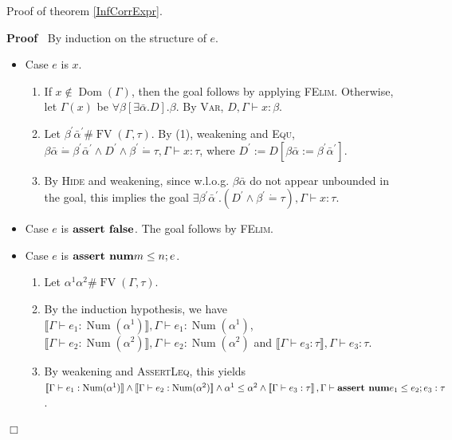 \documentclass{article}
\newcommand{\assign}{:=}
\newcommand{\nin}{\not\in}
\newcommand{\tmname}[1]{\textsc{#1}}
\newcommand{\tmop}[1]{\ensuremath{\operatorname{#1}}}
\newcommand{\tmstrong}[1]{\textbf{#1}}
\newenvironment{proof}{\noindent\textbf{Proof\ }}{\hspace*{\fill}$\Box$\medskip}
\begin{document}
Proof of theorem \ref{InfCorrExpr}.

\begin{proof}
  By induction on the structure of $e$.
  \begin{itemize}
    \item Case $e$ is $x$.
    \begin{enumerate}
      \item If $x \nin \tmop{Dom} (\Gamma)$, then the goal follows by applying
      {\tmname{FElim}}. Otherwise, let $\Gamma (x)$ be $\forall \beta [\exists
      \bar{\alpha} .D] . \beta$. By {\tmname{Var}}, $D, \Gamma \vdash x :
      \beta$.
      
      \item Let $\beta^{\prime} \bar{\alpha}^{\prime} \# \tmop{FV} (\Gamma,
      \tau)$. By (1), weakening and {\tmname{Equ}}, $\beta \bar{\alpha}
      \dot{=} \beta^{\prime} \bar{\alpha}^{\prime} \wedge D^{\prime} \wedge
      \beta^{\prime} \dot{=} \tau, \Gamma \vdash x : \tau$, where $D^{\prime}
      \assign D [\beta \bar{\alpha} \assign \beta^{\prime}
      \bar{\alpha}^{\prime}]$.
      
      \item By {\tmname{Hide}} and weakening, since w.l.o.g. $\beta
      \bar{\alpha}$ do not appear unbounded in the goal, this implies the goal
      $\exists \beta^{\prime} \bar{\alpha}^{\prime} . (D^{\prime} \wedge
      \beta^{\prime} \dot{=} \tau), \Gamma \vdash x : \tau$.
    \end{enumerate}
    
    
    \item Case $e$ is $\text{{\tmstrong{assert false}}}$. The goal follows by
    {\tmname{FElim}}.
    
    \item Case $e$ is $\text{{\tmstrong{assert num}}} m \leq n ; e$.
    \begin{enumerate}
      \item Let $\alpha^1 \alpha^2 \# \tmop{FV} (\Gamma, \tau)$.
      
      \item By the induction hypothesis, we have $\llbracket \Gamma \vdash e_1
      : \tmop{Num} (\alpha^1) \rrbracket, \Gamma \vdash e_1 : \tmop{Num}
      (\alpha^1)$, $\llbracket \Gamma \vdash e_2 : \tmop{Num} (\alpha^2)
      \rrbracket, \Gamma \vdash e_2 : \tmop{Num} (\alpha^2)$ and $\llbracket
      \Gamma \vdash e_3 : \tau \rrbracket, \Gamma \vdash e_3 : \tau$.
      
      \item By weakening and {\tmname{AssertLeq}}, this yields $\llbracket
      \Gamma \vdash e_1 : \tmop{Num} (\alpha^1) \rrbracket \wedge \llbracket
      \Gamma \vdash e_2 : \tmop{Num} (\alpha^2) \rrbracket \wedge \alpha^1
      \leq \alpha^2 \wedge \left\llbracket \Gamma \vdash e_3 : {\nobreak} \tau
      \right\rrbracket, \Gamma \vdash \text{{\tmstrong{assert num}}} e_1 \leq
      e_2 ; e_3 : \tau$.
      

\end{enumerate}
\end{itemize}
\end{proof}
\end{document}
